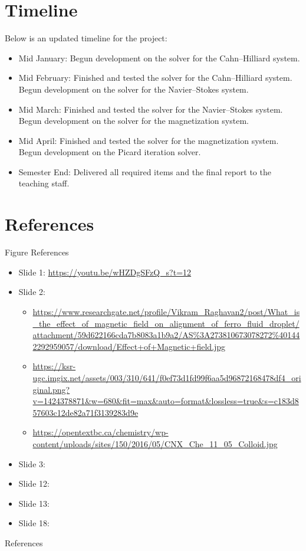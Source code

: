 \documentclass[9pt]{beamer}
\begin{document}
\section{Timeline}
Below is an updated timeline for the project:
\begin{itemize}
	\item Mid January: Begun development on the solver for the Cahn--Hilliard system.
	
	\item Mid February: Finished and tested the solver for the Cahn--Hilliard system. Begun development on the solver for the Navier--Stokes system.
	
	\item Mid March: Finished and tested the solver for the Navier--Stokes system. Begun development on the solver for the magnetization system. 

	\item Mid April: Finished and tested the solver for the magnetization system. Begun development on the Picard iteration solver.
	
	\item Semester End: Delivered all required items and the final report to the teaching staff.
\end{itemize}


\section{References}
\begin{frame}{Figure References}
\begin{itemize}
	\item Slide 1: \url{https://youtu.be/wHZDgSFzQ_s?t=12}
	\item Slide 2:
	\begin{itemize}
		\item \url{https://www.researchgate.net/profile/Vikram\_Raghavan2/post/What\_is\_the\_effect\_of\_magnetic\_field\_on\_alignment\_of\_ferro\_fluid\_droplet/attachment/59d622166cda7b8083a1b9a2/AS\%3A273810673078272\%401442292959057/download/Effect+of+Magnetic+field.jpg}
		\item \url{https://ksr-ugc.imgix.net/assets/003/310/641/f0ef73d1fd99f6aa5d96872168478df4\_original.png?v=1424378871\&w=680\&fit=max\&auto=format\&lossless=true\&s=c183d857603c12de82a71f3139283d9e}
		\item \url{https://opentextbc.ca/chemistry/wp-content/uploads/sites/150/2016/05/CNX\_Che\_11\_05\_Colloid.jpg}
	\end{itemize}
	\item Slide 3: \cite{DrugTarget}
	\item Slide 12: \cite{DiffuseInterface}
	\item Slide 13: \cite{DiffuseInterface}
	\item Slide 18: \cite{DiffuseInterface}
\end{itemize}
\end{frame}

\tiny

\begin{frame}[allowframebreaks]{References}
	
	
\end{frame}
\end{document}
